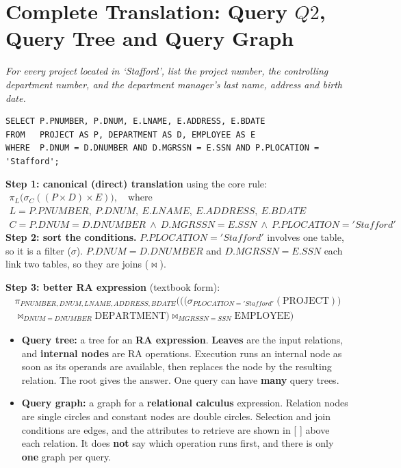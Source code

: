 \documentclass[10pt,a4paper]{article}
\newcommand{\R}[1]{\mathrm{#1}}          %
\begin{document}
\section{Complete Translation: Query $Q2$, Query Tree and Query Graph}

\begin{exbox}[Q2 (slide 272)]
\emph{For every project located in `Stafford', list the project number, the controlling department number, and the department manager's last name, address and birth date.}
\begin{verbatim}
SELECT P.PNUMBER, P.DNUM, E.LNAME, E.ADDRESS, E.BDATE
FROM   PROJECT AS P, DEPARTMENT AS D, EMPLOYEE AS E
WHERE  P.DNUM = D.DNUMBER AND D.MGRSSN = E.SSN AND P.PLOCATION = 'Stafford';
\end{verbatim}
\textbf{Step 1: canonical (direct) translation} using the core rule:
\begin{gather*}
\pi_{L}\big(\sigma_{C}((P \times D) \times E)\big), \quad\text{where}\\
L = P.PNUMBER,\ P.DNUM,\ E.LNAME,\ E.ADDRESS,\ E.BDATE\\
C = P.DNUM=D.DNUMBER\ \wedge\ D.MGRSSN=E.SSN\ \wedge\ P.PLOCATION='Stafford'
\end{gather*}
\textbf{Step 2: sort the conditions.} $P.PLOCATION='Stafford'$ involves one table, so it is a filter ($\sigma$). $P.DNUM=D.DNUMBER$ and $D.MGRSSN=E.SSN$ each link two tables, so they are joins ($\bowtie$).

\textbf{Step 3: better RA expression} (textbook form):
\begin{multline*}
\pi_{PNUMBER,DNUM,LNAME,ADDRESS,BDATE}\Big(\big(\big(\sigma_{PLOCATION='Stafford'}(\R{PROJECT})\big)\\
\bowtie_{DNUM=DNUMBER} \R{DEPARTMENT}\big) \bowtie_{MGRSSN=SSN} \R{EMPLOYEE}\Big)
\end{multline*}
\end{exbox}

\begin{keybox}
\begin{itemize}
  \item \textbf{Query tree:} a tree for an \textbf{RA expression}. \textbf{Leaves} are the input relations, and \textbf{internal nodes} are RA operations. Execution runs an internal node as soon as its operands are available, then replaces the node by the resulting relation. The root gives the answer. One query can have \textbf{many} query trees.
  \item \textbf{Query graph:} a graph for a \textbf{relational calculus} expression. Relation nodes are single circles and constant nodes are double circles. Selection and join conditions are edges, and the attributes to retrieve are shown in [ ] above each relation. It does \textbf{not} say which operation runs first, and there is only \textbf{one} graph per query.
\end{itemize}
\end{keybox}
\end{document}
